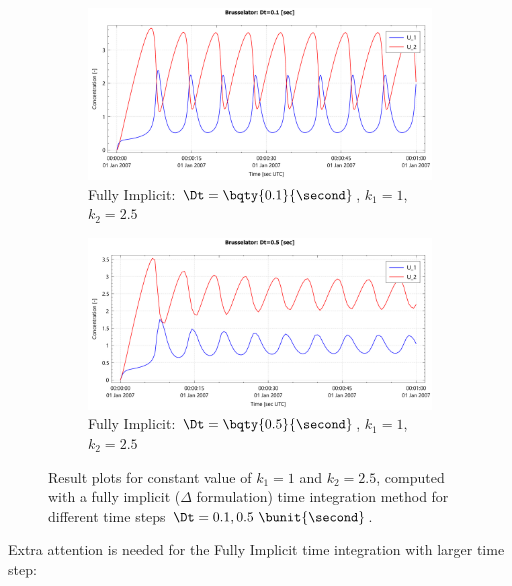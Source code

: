 \begin{figure}[H]
    \begin{subfigure}{0.5\textwidth}
        \includegraphics[width=\textwidth]{figures/brusselator_imp_dt=0d10.pdf}
        \caption{Fully Implicit: $\Dt=\bqty{0.1}{\second}$, $k_1=1$, $k_2=2.5$}
    \end{subfigure}
    \begin{subfigure}{0.5\textwidth}
        \includegraphics[width=\textwidth]{figures/brusselator_imp_dt=0d50.pdf}
        \caption{Fully Implicit: $\Dt=\bqty{0.5}{\second}$, $k_1=1$, $k_2=2.5$}
    \end{subfigure}
    \caption[Brusselator experiment: $\Dt = 0.1, 0.5\ \bunit{\second}$]{Result plots for constant value of $k_1 = 1$ and $k_2 =2.5$, computed with a fully implicit ($\Delta$ formulation) time integration method for different time steps $\Dt = 0.1, 0.5\ \bunit{\second}$.}
\end{figure}
Extra attention is needed for the Fully Implicit time integration with larger time step:
